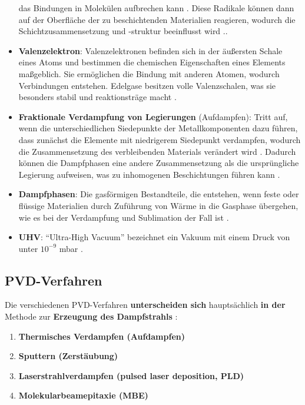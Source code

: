 \documentclass{article} %
\begin{document}
\begin{itemize}
{    das Bindungen in Molekülen aufbrechen kann \cite{boehler1994, hutchings2018}. Diese Radikale können dann auf der Oberfläche der zu beschichtenden Materialien 
    reagieren, wodurch die Schichtzusammensetzung und -struktur beeinflusst wird \cite{journal_reference}.}.
    \item \textbf{Valenzelektron}: Valenzelektronen befinden sich in der äußersten Schale eines Atoms und bestimmen die chemischen Eigenschaften eines Elements 
    maßgeblich. Sie ermöglichen die Bindung mit anderen Atomen, wodurch Verbindungen entstehen. Edelgase besitzen volle Valenzschalen, was sie besonders stabil und 
    reaktionsträge macht \cite{petrucci_general_chemistry, chang_chemistry, brown_chemistry_textbook}.
    \item \textbf{Fraktionale Verdampfung von Legierungen} (Aufdampfen): Tritt auf, wenn die unterschiedlichen Siedepunkte der Metallkomponenten dazu führen, dass 
    zunächst die Elemente mit niedrigerem Siedepunkt verdampfen, wodurch die Zusammensetzung des verbleibenden Materials verändert wird \cite{harvard_mrsec, 
    vem_guide}. Dadurch können die Dampfphasen eine andere Zusammensetzung als die ursprüngliche Legierung aufweisen, was zu inhomogenen Beschichtungen führen 
    kann \cite{frontiers_mpea, mdpi_vacuum_distillation}.
    \item \textbf{Dampfphasen}: Die gasförmigen Bestandteile, die entstehen, wenn feste oder flüssige Materialien durch Zuführung von Wärme in die Gasphase 
    übergehen, wie es bei der Verdampfung und Sublimation der Fall ist \cite{thermopedia, thoughtco, opentextbc}.
    \item \textbf{UHV}: ``Ultra-High Vacuum'' bezeichnet ein Vakuum mit einem Druck von unter \(10^{-9}\) mbar \cite{atkins_physical_chemistry, ohring2002, 
    smith1995}.
\end{itemize}

\vspace{1em}
\subsection{PVD-Verfahren} %
Die verschiedenen PVD-Verfahren \textbf{unterscheiden sich} hauptsächlich \textbf{in der} Methode zur \textbf{Erzeugung des Dampfstrahls} 
\cite{keplinger2024}:

\begin{enumerate}
    \item \textbf{Thermisches Verdampfen (Aufdampfen)}
    \item \textbf{Sputtern (Zerstäubung)}
    \item \textbf{Laserstrahlverdampfen (pulsed laser deposition, PLD)}
    \item \textbf{Molekularbeamepitaxie (MBE)}
\end{enumerate}
\end{document}
